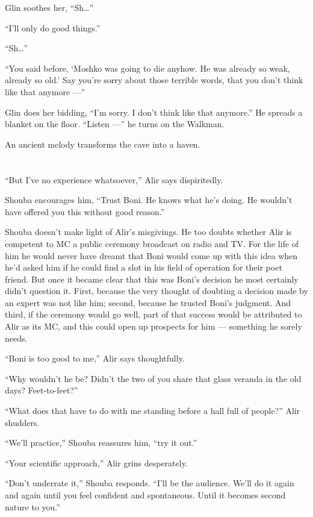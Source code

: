 \documentclass[twoside,11pt,openany]{book}
\begin{document}
Glin soothes her, ``Sh{\ldots}''

``I'll only do good things.''

``Sh{\ldots}''

``You said before, `Moshko was going to die anyhow. He was already so weak, already so old.' Say you're
sorry about those terrible words, that you don't think like that anymore ---''

Glin does her bidding, ``I'm sorry. I don't think like that anymore.'' He spreads a blanket on
the floor. ``Listen ---'' he turns on the Walkman.

An ancient melody transforms the cave into a haven.


\bigskip

\chapter{}

``But I've no experience whatsoever,'' Alir says dispiritedly.

Shouba encourages him, ``Trust Boni. He knows what he's doing. He wouldn't have offered you this without
good reason.''

Shouba doesn't make light of Alir's misgivings. He too doubts whether Alir is competent to MC a public ceremony
broadcast on radio and TV. For the life of him he would never have dreamt that Boni would come up with this idea when
he'd asked him if he could find a slot in his field of operation for their poet friend. But once it became clear that
this was Boni's decision he most certainly didn't question it. First, because the very thought of doubting a decision
made by an expert was not like him; second, because he trusted Boni's judgment. And third, if the ceremony would go
well, part of that success would be attributed to Alir as its MC, and this could open up prospects for him --- something
he sorely needs.

``Boni is too good to me,'' Alir says thoughtfully.

``Why wouldn't he be? Didn't the two of you share that glass veranda in the old days?
Feet-to-feet?''

``What does that have to do with me standing before a hall full of people?'' Alir shudders.

``We'll practice,'' Shouba reassures him, ``try it out.''

``Your scientific approach,'' Alir grins desperately.

``Don't underrate it,'' Shouba responds. ``I'll be the audience. We'll do it
again and again until you feel confident and spontaneous. Until it becomes second nature to you.''
\end{document}
